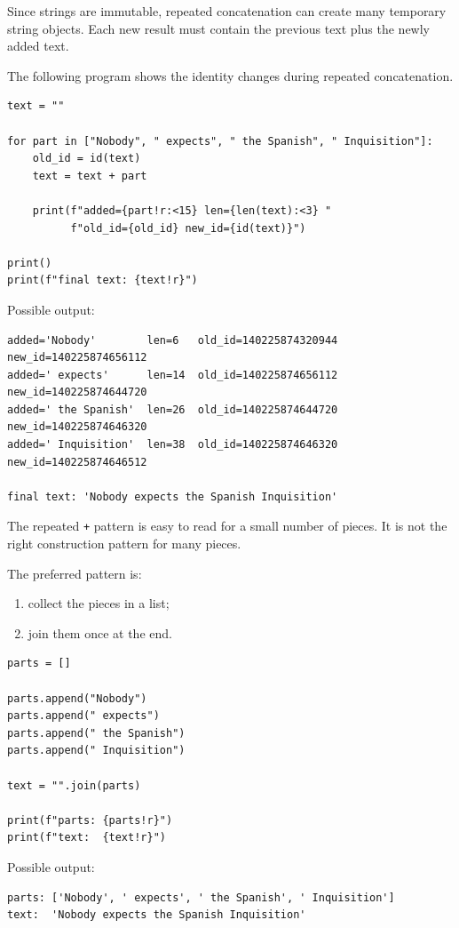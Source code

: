 Since strings are immutable, repeated concatenation can create many temporary string objects. Each new result must contain the previous text plus the newly added text.

The following program shows the identity changes during repeated concatenation.

\begin{verbatim}
text = ""

for part in ["Nobody", " expects", " the Spanish", " Inquisition"]:
    old_id = id(text)
    text = text + part

    print(f"added={part!r:<15} len={len(text):<3} "
          f"old_id={old_id} new_id={id(text)}")

print()
print(f"final text: {text!r}")
\end{verbatim}

Possible output:

\begin{verbatim}
added='Nobody'        len=6   old_id=140225874320944 new_id=140225874656112
added=' expects'      len=14  old_id=140225874656112 new_id=140225874644720
added=' the Spanish'  len=26  old_id=140225874644720 new_id=140225874646320
added=' Inquisition'  len=38  old_id=140225874646320 new_id=140225874646512

final text: 'Nobody expects the Spanish Inquisition'
\end{verbatim}

The repeated \texttt{+} pattern is easy to read for a small number of pieces. It is not the right construction pattern for many pieces.

The preferred pattern is:

\begin{enumerate}
    \item collect the pieces in a list;
    \item join them once at the end.
\end{enumerate}

\begin{verbatim}
parts = []

parts.append("Nobody")
parts.append(" expects")
parts.append(" the Spanish")
parts.append(" Inquisition")

text = "".join(parts)

print(f"parts: {parts!r}")
print(f"text:  {text!r}")
\end{verbatim}

Possible output:

\begin{verbatim}
parts: ['Nobody', ' expects', ' the Spanish', ' Inquisition']
text:  'Nobody expects the Spanish Inquisition'
\end{verbatim}

